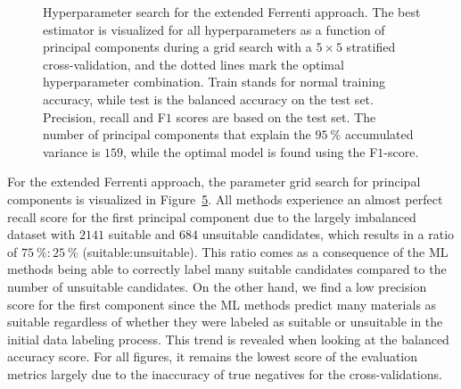 \documentclass[superscriptaddress,unsortedaddress,
 amsmath,amssymb,
 aps,
]{revtex4-2}
\begin{document}
\begin{figure}[ht!]
  \begin{subfigure}[b]{1.0\textwidth}
    \centering
    
  \end{subfigure}
\par\bigskip
  \begin{subfigure}[b]{0.5\textwidth}
    
    \caption{}
    \label{fig:q2-LOG}
  \end{subfigure}%
  \hfill
  \begin{subfigure}[b]{0.5\textwidth}
    
    \caption{}
    \label{fig:q2-DT}
  \end{subfigure}

  \begin{subfigure}[b]{0.5\textwidth}
    
    \caption{}
    \label{fig:q2-RF}
  \end{subfigure}%
  \hfill
  \begin{subfigure}[b]{0.5\textwidth}
    
    \caption{}
    \label{fig:q2-GB}
  \end{subfigure}
  \caption{Hyperparameter search for the extended Ferrenti approach. The best estimator is visualized for all hyperparameters as a function of principal components during a grid search with a $5\times5$ stratified cross-validation, and the dotted lines mark the optimal hyperparameter combination. Train stands for normal training accuracy, while test is the balanced accuracy on the test set. Precision, recall and F$1$ scores  are based on the test set. The number of principal components that explain the $95 \ \%$ accumulated variance is $159$, while the optimal model is found using the F$1$-score.}
  \label{fig:02-pca}
\end{figure}

For the extended Ferrenti approach, the parameter grid search for principal components is visualized in Figure~\ref{fig:02-pca}. All methods experience an almost perfect recall score for the first principal component due to the largely imbalanced dataset with $2141$ suitable and $684$ unsuitable candidates, which results in  a ratio of $75 \ \% : 25 \ \%$ (suitable:unsuitable). This ratio comes as a consequence of the ML methods being able to correctly label many suitable candidates compared to the number of unsuitable candidates. 
On the other hand, we find a low precision score for the first component since the ML methods  predict many materials as suitable regardless of whether they were labeled as suitable or unsuitable in the initial data labeling process. 
This trend is revealed when looking at the balanced accuracy score. For all figures, it remains the lowest score of the evaluation metrics largely due to the inaccuracy of true negatives for the cross-validations.  
\end{document}
